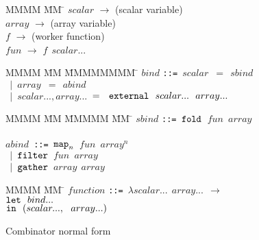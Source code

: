 \begin{figure}
\begin{tabbing}
MMMM        \= MM \= \kill
$scalar$    \> $\to$ \> (scalar variable)      \\
$array$     \> $\to$ \> (array variable)       \\
$f$         \> $\to$ \> (worker function)      \\
$fun$       \> $\to$ \> $f~~ scalar...$          \\
\end{tabbing}
\begin{tabbing}
MMMM        \= MM \= MMMMMMMM \= \kill
$bind$      \> \tt{::=} \> $scalar$ \> $=~~ sbind$ \\
            \> $~~|$    \> $array$  \> $=~~ abind$ \\
            \> $~~|$    \> $scalar...,array...$  \> $=~~ \tt{external}~~ scalar...~~ array...$
\end{tabbing}
\begin{tabbing}
MMMM        \= MM \= MMMMM \= MM \= \kill
$sbind$     \> \tt{::=} \> $\tt{fold}$  \> $fun$ \> $array$ \\
\\[2ex]

$abind$     \> \tt{::=} \> $\tt{map}_n$ \> $fun$ \> $array^n$ \\
            \> $~~|$    \> $\tt{filter}$\> $fun$ \> $array$ \\
            \> $~~|$    \> $\tt{gather}$\>       \> $array~~ array$ \\
\end{tabbing}
\begin{tabbing}
MMMM        \= MM \= \kill
$function$  \> \tt{::=} \> $\lambda scalar...~~array...~~ \to$      \\
            \>          \> $\tt{let}~~bind...$                  \\
            \>          \> $\tt{in}~~(scalar...,~~array...)$    \\
\end{tabbing}
\caption{Combinator normal form}
\label{f:CombinatorNormalForm}
\end{figure}


